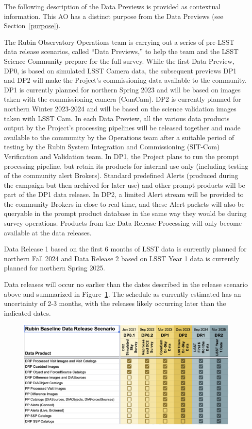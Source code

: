 \documentclass[SE,authoryear,toc,lsstdraft]{lsstdoc}
\begin{document}
The following description of the Data Previews is provided as contextual information. This AO has a distinct purpose from the Data Previews (see Section~\ref{purpose}).

The Rubin Observatory Operations team is carrying out a series of pre-LSST data release scenarios, called ``Data Previews,'' to help the team and the LSST Science Community prepare for the full survey. While the first Data Preview, DP0, is based on simulated LSST Camera data, the subsequent previews DP1 and DP2 will make the Project's commissioning data available to the community. DP1 is currently planned for northern Spring 2023 and will be based on images taken with the commissioning camera (ComCam). DP2 is currently planned for northern Winter 2023-2024 and will be based on the science validation images taken with LSST Cam. In each Data Preview, all the various data products output by the Project's processing pipelines will be released together and made available to the community by the Operations team after a suitable period of testing by the Rubin System Integration and Commissioning (SIT-Com) Verification and Validation team. In DP1, the Project plans to run the prompt processing pipeline, but retain its products for internal use only (including testing of the community alert Brokers). Standard predefined Alerts (produced during the campaign but then archived for later use) and other prompt products will be part of the DP1 data release. In DP2, a limited Alert stream will be provided to the community Brokers in close to real time, and these Alert packets will also be queryable in the prompt product database in the same way they would be during survey operations. Products from the Data Release Processing will only become available at the data releases. 

Data Release 1 based on the first 6 months of LSST data is currently planned for northern Fall 2024 and Data Release 2 based on LSST Year 1 data is currently planned for northern Spring 2025.

Data releases will occur no earlier than the dates described in the release scenario above and summarized in Figure~\ref{release_scenarios}. The schedule as currently estimated has an uncertainty of 2-3 months, with the releases likely occurring later than the indicated dates.

\begin{figure}
\label{release_scenarios}
\centering
\includegraphics[width=\textwidth]{rubin_data_release_scenarios.png}
\end{figure}
\end{document}
